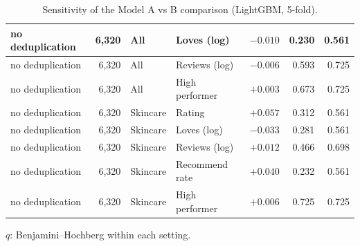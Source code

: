 \begin{table}[htbp]
\begin{tabular}{|l|r|l|l|r|r|r|}
\hline
no deduplication & 6,320 & All & Loves (log) & $-0.010$ & 0.230 & 0.561 \\
\hline
no deduplication & 6,320 & All & Reviews (log) & $-0.006$ & 0.593 & 0.725 \\
\hline
no deduplication & 6,320 & All & High performer & $+0.003$ & 0.673 & 0.725 \\
\hline
no deduplication & 6,320 & Skincare & Rating & $+0.057$ & 0.312 & 0.561 \\
\hline
no deduplication & 6,320 & Skincare & Loves (log) & $-0.033$ & 0.281 & 0.561 \\
\hline
no deduplication & 6,320 & Skincare & Reviews (log) & $+0.012$ & 0.466 & 0.698 \\
\hline
no deduplication & 6,320 & Skincare & Recommend rate & $+0.040$ & 0.232 & 0.561 \\
\hline
no deduplication & 6,320 & Skincare & High performer & $+0.006$ & 0.725 & 0.725 \\
\hline
\end{tabular}
\par\smallskip
\parbox{0.95\linewidth}{\footnotesize $q$: Benjamini--Hochberg within each setting.}
\caption{Sensitivity of the Model A vs B comparison (LightGBM, 5-fold).}
\label{tab:sensitivity}
\end{table}
